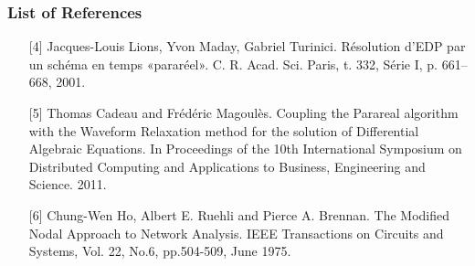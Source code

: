 \documentclass[colorbacktitle,inverttitle,landscape,presentation,
	english,
	aspectratio=43, %
	accentcolor=tud9b, %
]{tudbeamer}
\begin{document}
\begin{frame}
\frametitle{List of References}
	\begin{enumerate}
	\item[{[4]}]
Jacques-Louis Lions, Yvon Maday, Gabriel Turinici. Résolution d’EDP par
un schéma en temps «pararéel». C. R. Acad. Sci. Paris, t. 332, Série I, p.
661–668, 2001.

	\item[{[5]}]
Thomas Cadeau and Frédéric Magoulès. Coupling the Parareal algorithm
with the Waveform Relaxation method for the solution of Differential
Algebraic Equations. In Proceedings of the 10th International Symposium
on Distributed Computing and Applications to Business, Engineering and
Science. 2011.

	\item[{[6]}]
Chung-Wen Ho, Albert E. Ruehli and Pierce A. Brennan. The Modified
Nodal Approach to Network Analysis. IEEE Transactions on Circuits and Systems, Vol. 22, No.6, pp.504-509, June 1975.
	\end{enumerate}
\end{frame}
	
	
\end{document}
